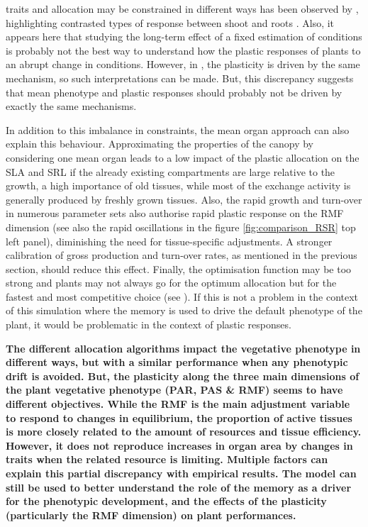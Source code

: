 traits and allocation may be constrained in different ways has been observed by \citet{freschet_integrated_2015}, highlighting contrasted types of response between shoot and roots \parencite{poorter_limits_2015}. Also, it appears here that studying the long-term effect of a fixed estimation of conditions is probably not the best way to understand how the plastic responses of plants to an abrupt change in conditions. However, in \model, the plasticity is driven by the same mechanism, so such interpretations can be made. But, this discrepancy suggests that mean phenotype and plastic responses should probably not be driven by exactly the same mechanisms.

In addition to this imbalance in constraints, the mean organ approach can also explain this behaviour. Approximating the properties of the canopy by considering one mean organ leads to a low impact of the plastic allocation on the SLA and SRL if the already existing compartments are large relative to the growth, a high importance of old tissues, while most of the exchange activity is generally produced by freshly grown tissues. Also, the rapid growth and turn-over in numerous parameter sets also authorise rapid plastic response on the RMF dimension (see also the rapid oscillations in the figure \ref{fig:comparison_RSR} top left panel), diminishing the need for tissue-specific adjustments. A stronger calibration of gross production and turn-over rates, as mentioned in the previous section, should reduce this effect. Finally, the optimisation function may be too strong and plants may not always go for the optimum allocation but for the fastest and most competitive choice (see \citet{farrior_resource_2011,dybzinski_evolutionarily_2011, farrior_competitive_2014}). If this is not a problem in the context of this simulation where the memory is used to drive the default phenotype of the plant, it would be problematic in the context of plastic responses.


\textbf{The different allocation algorithms impact the vegetative phenotype in different ways, but with a similar performance when any phenotypic drift is avoided. But, the plasticity along the three main dimensions of the plant vegetative phenotype (PAR, PAS \& RMF) seems to have different objectives. While the RMF is the main adjustment variable to respond to changes in equilibrium, the proportion of active tissues is more closely related to the amount of resources and tissue efficiency.  However, it does not reproduce increases in organ area by changes in traits when the related resource is limiting. Multiple factors can explain this partial discrepancy with empirical results. The model can still be used to better understand the role of the memory as a driver for the phenotypic development, and the effects of the plasticity (particularly the RMF dimension) on plant performances.}

